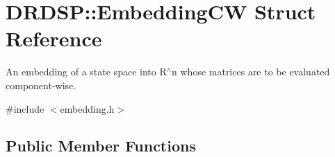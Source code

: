 \hypertarget{struct_d_r_d_s_p_1_1_embedding_c_w}{\section{D\-R\-D\-S\-P\-:\-:Embedding\-C\-W Struct Reference}
\label{struct_d_r_d_s_p_1_1_embedding_c_w}
}


An embedding of a state space into R$^\wedge$n whose matrices are to be evaluated component-\/wise.  




{\ttfamily \#include $<$embedding.\-h$>$}

\subsection*{Public Member Functions}
